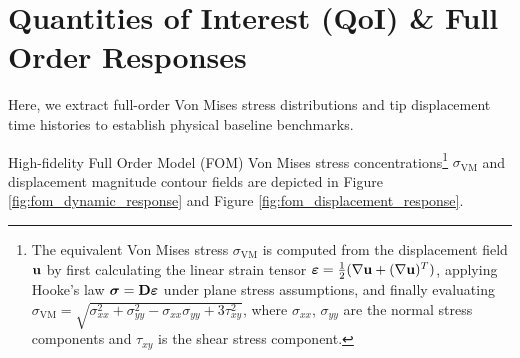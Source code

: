\section{Quantities of Interest (QoI) \& Full Order Responses}

Here, we extract full-order Von Mises stress distributions and tip displacement time histories to establish physical baseline benchmarks.

High-fidelity Full Order Model (FOM) Von Mises stress concentrations\footnote{The equivalent Von Mises stress $\sigma_{\text{VM}}$ is computed from the displacement field $\mathbf{u}$ by first calculating the linear strain tensor $\boldsymbol{\varepsilon} = \frac{1}{2}(\nabla\mathbf{u} + (\nabla\mathbf{u})^T)$, applying Hooke's law $\boldsymbol{\sigma} = \mathbf{D}\boldsymbol{\varepsilon}$ under plane stress assumptions, and finally evaluating $\sigma_{\text{VM}} = \sqrt{\sigma_{xx}^2 + \sigma_{yy}^2 - \sigma_{xx}\sigma_{yy} + 3\tau_{xy}^2}$, where $\sigma_{xx}$, $\sigma_{yy}$ are the normal stress components and $\tau_{xy}$ is the shear stress component.} $\sigma_{\text{VM}}$ and displacement magnitude contour fields are depicted in Figure \ref{fig:fom_dynamic_response} and Figure \ref{fig:fom_displacement_response}.

